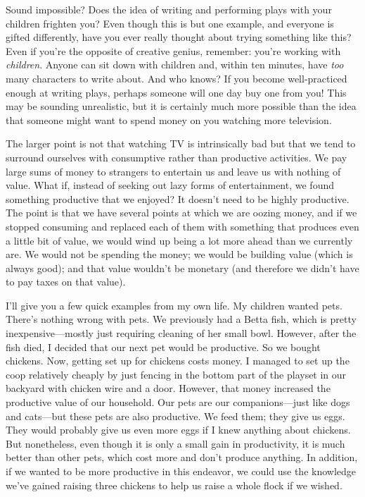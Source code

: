 Sound impossible? Does the idea of writing and performing plays with
your children frighten you?  Even though this is but one example,
and everyone is gifted differently, have you ever really thought
about trying something like this? Even if you’re the opposite of
creative genius, remember: you’re working with \textit{children}.
Anyone can sit down with children and, within ten minutes, have
\textit{too} many characters to write about. And who knows? If you become
well-practiced enough at writing plays, perhaps someone will one day
buy one from you!  This may be sounding unrealistic, but it is
certainly much more possible than the idea that someone might want to
spend money on you watching more television.

The larger point is not that watching TV is intrinsically bad but that
we tend to surround ourselves with consumptive rather than productive
activities. We pay large sums of money to strangers to entertain us and
leave us with nothing of value. What if, instead of seeking out lazy
forms of entertainment, we found something productive that we enjoyed? 
It doesn’t need to be highly productive. The point is that we have
several points at which we are oozing money, and if we stopped
consuming and replaced each of them with something that produces even a
little bit of value, we would wind up being a lot more ahead than we currently are. We
would not be spending the money; we would be building value (which is
always good); and that value wouldn’t be monetary (and therefore we
didn't have to pay taxes on that value).  

I’ll give you a few quick examples from my own life. My children wanted
pets. There’s nothing wrong with pets. We previously had a Betta fish,
which is pretty inexpensive---mostly just requiring cleaning of her small
bowl. However, after the fish died, I decided that our next pet would
be productive. So we bought chickens. Now, getting set up for chickens
costs money. I managed to set up the coop relatively cheaply by just
fencing in the bottom part of the playset in our backyard with chicken
wire and a door. However, that money increased the productive value of
our household. Our pets are our companions---just like dogs and cats---but
these pets are also productive. We feed them; they give us eggs. They
would probably give us even more eggs if I knew anything about
chickens. But nonetheless, even though it is only a small gain in
productivity, it is much better than other pets, which cost more and
don’t produce anything. In addition, if we wanted to be more productive
in this endeavor, we could use the knowledge we’ve gained raising three
chickens to help us raise a whole flock if we wished.

